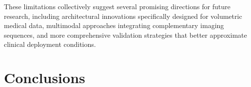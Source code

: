 \documentclass[12pt, a4paper]{article}
\begin{document}
    
    

These limitations collectively suggest several promising directions for future research, including architectural innovations specifically designed for volumetric medical data, multimodal approaches integrating complementary imaging sequences, and more comprehensive validation strategies that better approximate clinical deployment conditions.

\section{Conclusions}







 

\appendix





\end{document}
